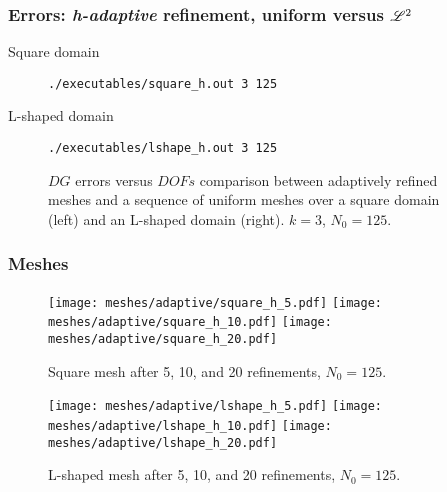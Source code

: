 \begin{frame}[fragile]
    \frametitle{Errors: \textit{h-adaptive} refinement, uniform versus $\mathscr{L}^2$}

    \begin{description}
        \item[Square domain] \lstinline{./executables/square_h.out 3 125}
        \item[L-shaped domain] \lstinline{./executables/lshape_h.out 3 125}
    \end{description}

    \begin{figure}[!ht]
        
        \caption{$DG$ errors versus $DOFs$ comparison between adaptively refined meshes and a sequence of uniform meshes over a square domain (left) and an L-shaped domain (right). $k = 3$, $N_0 = 125$.}
    \end{figure}
\end{frame}

\begin{frame}
    \frametitle{Meshes}

    \begin{figure}[!ht]
        \centering
        \texttt{[image: meshes/adaptive/square\_h\_5.pdf]}
        \texttt{[image: meshes/adaptive/square\_h\_10.pdf]}
        \texttt{[image: meshes/adaptive/square\_h\_20.pdf]}
        \caption{Square mesh after 5, 10, and 20 refinements, $N_0 = 125$.}
    \end{figure}
    
    \begin{figure}[!ht]
        \centering
        \texttt{[image: meshes/adaptive/lshape\_h\_5.pdf]}
        \texttt{[image: meshes/adaptive/lshape\_h\_10.pdf]}
        \texttt{[image: meshes/adaptive/lshape\_h\_20.pdf]}
        \caption{L-shaped mesh after 5, 10, and 20 refinements, $N_0 = 125$.}
    \end{figure}
\end{frame}

